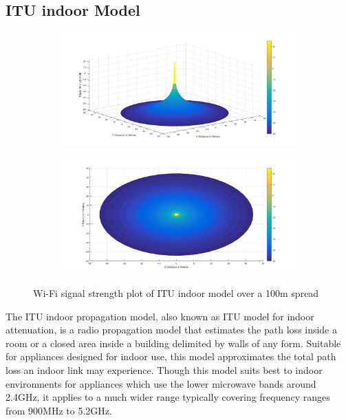 \subsection{ITU indoor Model}
\begin{figure}[!b]
\centering
	\begin{subfigure}[b]{\textwidth}
		\includegraphics[width=\textwidth]{images/ITU_rm_3d.png}
		\label{subfig:a}
		\caption{}
	\end{subfigure}
	\begin{subfigure}[b]{\textwidth}
		\includegraphics[width=\textwidth]{images/ITU_rm_tv.png}
		\label{subfig:b}
		\caption{}
	\end{subfigure}
\caption{Wi-Fi signal strength plot of ITU indoor model over a 100m spread}
\end{figure}
The ITU indoor propagation model, also known as ITU model for indoor attenuation, is a radio propagation model that estimates the path loss inside a room or a closed area inside a building delimited by walls of any form. Suitable for appliances designed for indoor use, this model approximates the total path loss an indoor link may experience\cite{31}. Though this model suits best to indoor environments for appliances which use the lower microwave bands around 2.4GHz, it applies to a much wider range typically covering frequency ranges from 900MHz to 5.2GHz.\\ 
